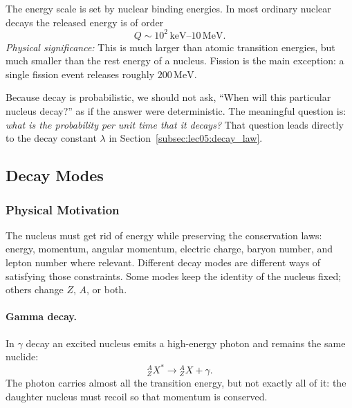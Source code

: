 
The energy scale is set by nuclear binding energies.  In most ordinary nuclear
decays the released energy is of order
\begin{equation}
  \label{eq:lec05:decay_energy_scale}
  \boxed{Q \sim 10^2\,\mathrm{keV}\text{--}10\,\mathrm{MeV}.}
\end{equation}
\textit{Physical significance:} This is much larger than atomic transition
energies, but much smaller than the rest energy of a nucleus.  Fission is the
main exception: a single fission event releases roughly $200\,\mathrm{MeV}$.

Because decay is probabilistic, we should not ask, ``When will this particular
nucleus decay?'' as if the answer were deterministic.  The meaningful question
is: \emph{what is the probability per unit time that it decays?}  That question
leads directly to the decay constant $\lambda$ in
Section~\ref{subsec:lec05:decay_law}.

\subsection{Decay Modes}
\label{subsec:lec05:decay_modes}

\subsubsection*{Physical Motivation}
The nucleus must get rid of energy while preserving the conservation laws:
energy, momentum, angular momentum, electric charge, baryon number, and lepton
number where relevant.  Different decay modes are different ways of satisfying
those constraints.  Some modes keep the identity of the nucleus fixed; others
change $Z$, $A$, or both.

\paragraph{Gamma decay.}
In $\gamma$ decay an excited nucleus emits a high-energy photon and remains the
same nuclide:
\begin{equation}
  \label{eq:lec05:gamma_decay}
  \boxed{{}^{A}_{Z}X^{*}\rightarrow{}^{A}_{Z}X+\gamma.}
\end{equation}
The photon carries almost all the transition energy, but not exactly all of it:
the daughter nucleus must recoil so that momentum is conserved.

